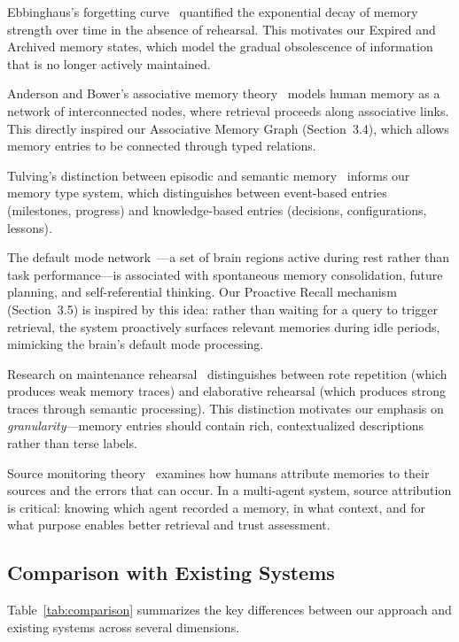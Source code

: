 \documentclass[11pt]{article}
\begin{document}
Ebbinghaus's forgetting curve~\cite{ebbinghaus1885} quantified the exponential decay of memory strength over time in the absence of rehearsal. This motivates our Expired and Archived memory states, which model the gradual obsolescence of information that is no longer actively maintained.

Anderson and Bower's associative memory theory~\cite{anderson1973} models human memory as a network of interconnected nodes, where retrieval proceeds along associative links. This directly inspired our Associative Memory Graph (Section~3.4), which allows memory entries to be connected through typed relations.

Tulving's distinction between episodic and semantic memory~\cite{tulving1972} informs our memory type system, which distinguishes between event-based entries (milestones, progress) and knowledge-based entries (decisions, configurations, lessons).

The default mode network~\cite{raichle2001}---a set of brain regions active during rest rather than task performance---is associated with spontaneous memory consolidation, future planning, and self-referential thinking. Our Proactive Recall mechanism (Section~3.5) is inspired by this idea: rather than waiting for a query to trigger retrieval, the system proactively surfaces relevant memories during idle periods, mimicking the brain's default mode processing.

Research on maintenance rehearsal~\cite{naveh1984} distinguishes between rote repetition (which produces weak memory traces) and elaborative rehearsal (which produces strong traces through semantic processing). This distinction motivates our emphasis on \emph{granularity}---memory entries should contain rich, contextualized descriptions rather than terse labels.

Source monitoring theory~\cite{johnson1993} examines how humans attribute memories to their sources and the errors that can occur. In a multi-agent system, source attribution is critical: knowing which agent recorded a memory, in what context, and for what purpose enables better retrieval and trust assessment.

\subsection{Comparison with Existing Systems}

Table~\ref{tab:comparison} summarizes the key differences between our approach and existing systems across several dimensions.
\end{document}
